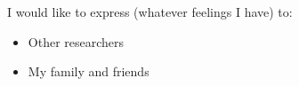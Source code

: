 \cleardoublepage


\begin{thesisacknowledgements}

I would like to express (whatever feelings I have) to:

\begin{itemize}
 \item Other researchers
 \vspace*{3mm}
 \item My family and friends
\end{itemize}

\end{thesisacknowledgements}

